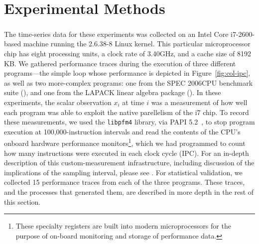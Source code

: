 \section{Experimental Methods}\label{sec:methods}



The time-series data for these experiments was collected on an Intel
Core\textsuperscript{\textregistered} i7-2600-based machine running
the 2.6.38-8 Linux kernel.  This particular microprocessor chip has
eight processing units, a clock rate of 3.40GHz, and a cache size of
8192 KB.  We gathered performance traces during the execution of three
different programs---the simple \col loop whose performance is
depicted in Figure~\ref{fig:col-ipc}, as well as two more-complex
programs: one from the SPEC 2006CPU benchmark suite (\gcc), and one
from the LAPACK linear algebra package (\svd).  In these experiments,
the scalar observation $x_{i}$ at time $i$ was a measurement of how
well each program was able to exploit the native parellelism of the i7
chip.  To record these measurements, we used the {\tt libpfm4}
library, via PAPI
% 
% 
5.2~\cite{papi}, to stop program execution at 100,000-instruction
intervals and read the contents of the CPU's onboard hardware
performance monitors\footnote{These specialty registers are built into
  modern microprocessors for the purpose of on-board monitoring and
  storage of performance data.}, which we had programmed to count how
many instructions were executed in each clock cycle (IPC).  For an
in-depth description of this custom-measurement infrastructure,
including discussion of the implications of the sampling interval,
please see \cite{zach-IDA10,mytkowicz09,todd-phd}.  For statistical
validation, we collected 15 performance traces from each of the three
programs.  These traces, and the processes that generated them, are
described in more depth in the rest of this section.


